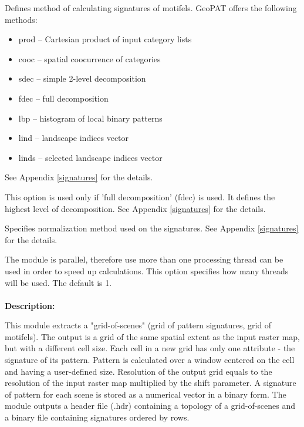 
Defines method of calculating signatures of motifels. GeoPAT offers the following methods: 
\begin{itemize}
	\item prod -- Cartesian product of input category lists
	\item cooc -- spatial coocurrence of categories
	\item sdec -- simple 2-level decomposition
	\item fdec -- full decomposition
	\item lbp -- histogram of local binary patterns
	\item lind -- landscape indices vector
	\item linds -- selected landscape indices vector
\end{itemize}
See Appendix \ref{signatures} for the details.


This option is used only if 'full decomposition' (fdec) is used.
It defines the highest level of decomposition. See Appendix \ref{signatures} for the details.


Specifies normalization method used on the signatures. 
See Appendix \ref{signatures} for the details.


The module is parallel, therefore use more than one processing thread can be used in order to speed up calculations. 
This option specifies how many threads will be used. 
The default is 1.
\\\\

{\bf Description:}

This module extracts a "grid-of-scenes" (grid of pattern signatures, grid of motifels).
The output is a grid of the same spatial extent as the input raster map, but with a different cell size.
Each cell in a new grid has only one attribute - the signature of its pattern. 
Pattern is calculated over a window centered on the cell and having a user-defined size.
Resolution of the output grid equals to the resolution of the input raster map multiplied by the shift parameter. 
A signature of pattern for each scene is stored as a numerical vector in a binary form.
The module outputs a header file (.hdr) containing a topology of a grid-of-scenes and a binary file containing signatures ordered by rows.

